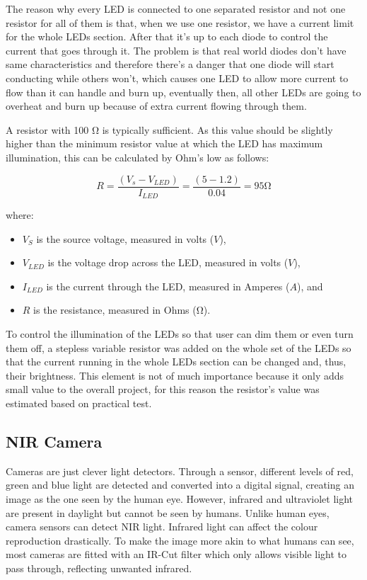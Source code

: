 The reason why every LED is connected to one separated resistor and not one resistor for all of them is that, when we use one resistor, we have a current limit for the whole LEDs section. After that it's up to each diode to control the current that goes through it. The problem is that real world diodes don't have same characteristics and therefore there's a danger that one diode will start conducting while others won't, which causes one LED to allow more current to flow than it can handle and burn up, eventually then, all other LEDs are going to overheat and burn up because of extra current flowing through them.

A resistor with 100 \si{\ohm} is typically sufficient. As this value should be slightly higher than the minimum resistor value at which the LED has maximum illumination, this can be calculated by Ohm’s low as follows:


\begin{equation}
R= \frac {(V_s - V_{LED})}{I_{LED}} =  \frac {(5-1.2)}{0.04}=95   \si{\ohm}
\end{equation}


where:
\begin{itemize}
  \item $V_S$ is the source voltage, measured in volts ($V$),
  \item $V_{LED}$ is the voltage drop across the LED, measured in volts ($V$),
  \item $I_{LED}$ is the current through the LED, measured in Amperes ($A$), and
  \item $R$ is the resistance, measured in Ohms (\si{\ohm}).
\end{itemize}


To control the illumination of the LEDs so that user can dim them or even turn them off, a stepless variable resistor was added on the whole set of the LEDs so that the current running in the whole LEDs section can be changed and, thus, their brightness. This element is not of much importance because it only adds small value to the overall project, for this reason the resistor's value was estimated based on practical test.


\subsection{NIR Camera}

Cameras are just clever light detectors. Through a sensor, different levels of red, green and blue light are detected and converted into a digital signal, creating an image as the one seen by the human eye. However, infrared and ultraviolet light are present in daylight but cannot be seen by humans. Unlike human eyes, camera sensors can detect NIR light. Infrared light can affect the colour reproduction drastically. To make the image more akin to what humans can see, most cameras are fitted with an IR-Cut filter which only allows visible light to pass through, reflecting unwanted infrared. 

